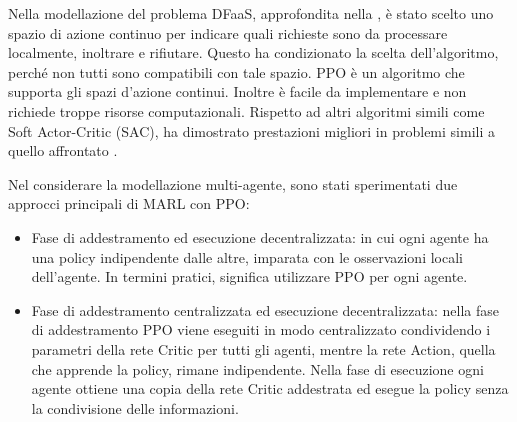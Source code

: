 Nella modellazione del problema DFaaS, approfondita nella , è stato scelto uno spazio di azione continuo per indicare quali richieste sono da processare localmente, inoltrare e rifiutare. Questo ha condizionato la scelta dell'algoritmo, perché non tutti sono compatibili con tale spazio. PPO è un algoritmo che supporta gli spazi d'azione continui. Inoltre è facile da implementare e non richiede troppe risorse computazionali. Rispetto ad altri algoritmi simili come Soft Actor-Critic (SAC), ha dimostrato prestazioni migliori in problemi simili a quello affrontato \cite{Haarnoja2018, Petriglia2024}.

Nel considerare la modellazione multi-agente, sono stati sperimentati due approcci principali di MARL con PPO:

\begin{itemize}
    \item Fase di addestramento ed esecuzione decentralizzata: in cui ogni agente ha una policy indipendente dalle altre, imparata con le osservazioni locali dell'agente. In termini pratici, significa utilizzare PPO per ogni agente.

    \item Fase di addestramento centralizzata ed esecuzione decentralizzata: nella fase di addestramento PPO viene eseguiti in modo centralizzato condividendo i parametri della rete Critic per tutti gli agenti, mentre la rete Action, quella che apprende la policy, rimane indipendente. Nella fase di esecuzione ogni agente ottiene una copia della rete Critic addestrata ed esegue la policy senza la condivisione delle informazioni.
\end{itemize}